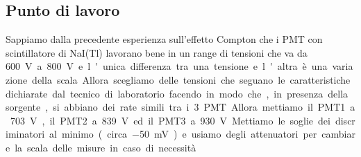 \subsection{Punto di lavoro}

Sappiamo dalla precedente esperienza sull'effetto Compton che i PMT con scintillatore di NaI(Tl) lavorano bene in un range di tensioni che va da \SI{600}V a \SI{800}V e l'unica differenza tra una tensione e l'altra è una variazione della scala.
Allora scegliamo delle tensioni che seguano le caratteristiche dichiarate dal tecnico di laboratorio facendo in modo che, in presenza della sorgente, si abbiano dei rate simili tra i 3 PMT.
Allora mettiamo il PMT1 a \SI{703}V, il PMT2 a \SI{839}V ed il PMT3 a \SI{930}V.

Mettiamo le soglie dei discriminatori al minimo (circa \SI{-50}{mV}) e usiamo degli attenuatori per cambiare la scala delle misure in caso di necessità.
